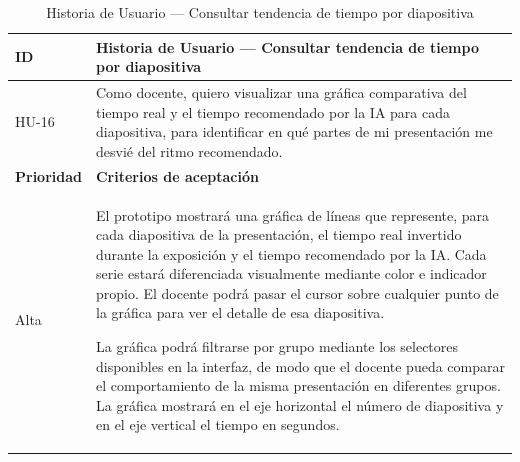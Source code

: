 \documentclass[11pt]{article}
\begin{document}
\begin{table}[H]
    \centering
    \renewcommand{\arraystretch}{1.2}
    \begin{tabular}{|p{2.5cm}|p{11cm}|}
        \hline
        \textbf{ID} & \textbf{Historia de Usuario --- Consultar tendencia de tiempo por diapositiva} \\
        \hline
        HU-16 & Como docente, quiero visualizar una gráfica comparativa del tiempo real y el tiempo recomendado por la IA para cada diapositiva, para identificar en qué partes de mi presentación me desvié del ritmo recomendado. \\
        \hline
        \textbf{Prioridad} & \textbf{Criterios de aceptación} \\
        \hline
        Alta & El prototipo mostrará una gráfica de líneas que represente, para cada diapositiva de la presentación, el tiempo real invertido durante la exposición y el tiempo recomendado por la IA. Cada serie estará diferenciada visualmente mediante color e indicador propio. El docente podrá pasar el cursor sobre cualquier punto de la gráfica para ver el detalle de esa diapositiva.

        La gráfica podrá filtrarse por grupo mediante los selectores disponibles en la interfaz, de modo que el docente pueda comparar el comportamiento de la misma presentación en diferentes grupos. La gráfica mostrará en el eje horizontal el número de diapositiva y en el eje vertical el tiempo en segundos. \\
        \hline
    \end{tabular}
    \caption{Historia de Usuario --- Consultar tendencia de tiempo por diapositiva}
    \label{tab:hu-consultar-tendencia-tiempo}
\end{table}
\end{document}
